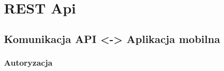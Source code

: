 \chapter{REST Api} %
\label{cha:rest_api}

\section{Komunikacja API <-> Aplikacja mobilna} %
\label{sec:komunikacja_api_aplikacja_mobilna}

\subsection{Autoryzacja} %
\label{sub:autoryzacja}

